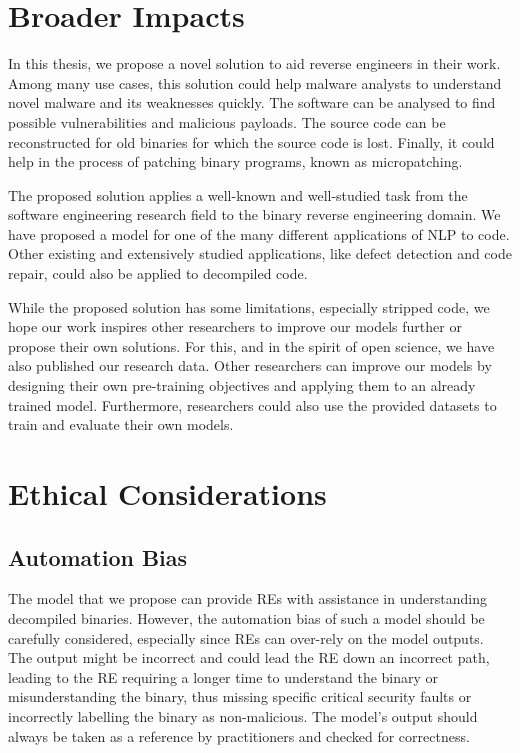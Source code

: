 \section{Broader Impacts}
In this thesis, we propose a novel solution to aid reverse engineers in their work. Among many use cases, this solution could help malware analysts to understand novel malware and its weaknesses quickly. The software can be analysed to find possible vulnerabilities and malicious payloads. The source code can be reconstructed for old binaries for which the source code is lost. Finally, it could help in the process of patching binary programs, known as micropatching.

The proposed solution applies a well-known and well-studied task from the software engineering research field to the binary reverse engineering domain. We have proposed a model for one of the many different applications of NLP to code. Other existing and extensively studied applications, like defect detection and code repair, could also be applied to decompiled code. 

While the proposed solution has some limitations, especially stripped code, we hope our work inspires other researchers to improve our models further or propose their own solutions. For this, and in the spirit of open science, we have also published our research data. Other researchers can improve our models by designing their own pre-training objectives and applying them to an already trained model. Furthermore, researchers could also use the provided datasets to train and evaluate their own models.

\section{Ethical Considerations}
\subsection{Automation Bias}
The model that we propose can provide REs with assistance in understanding decompiled binaries. However, the automation bias of such a model should be carefully considered, especially since REs can over-rely on the model outputs. The output might be incorrect and could lead the RE down an incorrect path, leading to the RE requiring a longer time to understand the binary or misunderstanding the binary, thus missing specific critical security faults or incorrectly labelling the binary as non-malicious. The model's output should always be taken as a reference by practitioners and checked for correctness.

